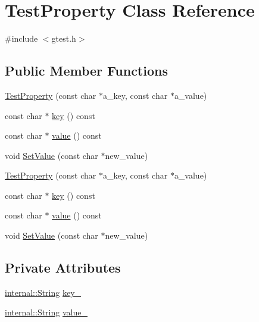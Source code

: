 \hypertarget{classtesting_1_1TestProperty}{\section{\-Test\-Property \-Class \-Reference}
\label{dd/dde/classtesting_1_1TestProperty}
}


{\ttfamily \#include $<$gtest.\-h$>$}

\subsection*{\-Public \-Member \-Functions}
\begin{DoxyCompactItemize}
\item 
\hyperlink{classtesting_1_1TestProperty_aab1f73edbd7dad831bc257787b31b318}{\-Test\-Property} (const char $\ast$a\-\_\-key, const char $\ast$a\-\_\-value)
\item 
const char $\ast$ \hyperlink{classtesting_1_1TestProperty_a871bfa25d6b53e6705c23ea97bd9d867}{key} () const 
\item 
const char $\ast$ \hyperlink{classtesting_1_1TestProperty_aaac246875dd40e9841b7855bc1b0fb49}{value} () const 
\item 
void \hyperlink{classtesting_1_1TestProperty_ad6397aa17e2450f86d739ce28fb41fb8}{\-Set\-Value} (const char $\ast$new\-\_\-value)
\item 
\hyperlink{classtesting_1_1TestProperty_aab1f73edbd7dad831bc257787b31b318}{\-Test\-Property} (const char $\ast$a\-\_\-key, const char $\ast$a\-\_\-value)
\item 
const char $\ast$ \hyperlink{classtesting_1_1TestProperty_a871bfa25d6b53e6705c23ea97bd9d867}{key} () const 
\item 
const char $\ast$ \hyperlink{classtesting_1_1TestProperty_aaac246875dd40e9841b7855bc1b0fb49}{value} () const 
\item 
void \hyperlink{classtesting_1_1TestProperty_ad6397aa17e2450f86d739ce28fb41fb8}{\-Set\-Value} (const char $\ast$new\-\_\-value)
\end{DoxyCompactItemize}
\subsection*{\-Private \-Attributes}
\begin{DoxyCompactItemize}
\item 
\hyperlink{classtesting_1_1internal_1_1String}{internal\-::\-String} \hyperlink{classtesting_1_1TestProperty_a961f622e9fe275ed51f92b04262542ac}{key\-\_\-}
\item 
\hyperlink{classtesting_1_1internal_1_1String}{internal\-::\-String} \hyperlink{classtesting_1_1TestProperty_a52b34cd6a1fa46f2a98c0147ef7d050e}{value\-\_\-}
\end{DoxyCompactItemize}


